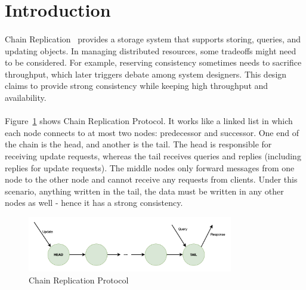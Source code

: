 \section{Introduction}
\setcounter{subsection}{0}
\renewcommand*{\thesubsection}{\Alph{subsection}.}

\paragraph*{}
Chain Replication~\cite{van2004chain} provides a storage system that supports storing, queries, and updating objects. In managing distributed resources, some tradeoffs might need to be considered. For example, reserving consistency sometimes needs to sacrifice throughput, which later triggers debate among system designers. This design claims to provide strong consistency while keeping high throughput and availability.

\paragraph*{}
Figure~\ref{fig:CRP} shows Chain Replication Protocol. It works like a linked list in which each node connects to at most two nodes: predecessor and successor. One end of the chain is the head, and another is the tail. The head is responsible for receiving update requests, whereas the tail receives queries and replies (including replies for update requests). The middle nodes only forward messages from one node to the other node and cannot receive any requests from clients. Under this scenario, anything written in the tail, the data must be written in any other nodes as well - hence it has a strong consistency.

\begin{figure}[h]
    \centering
    \includegraphics[width=0.8\textwidth]{images/ChainReplication.png}
    \caption{Chain Replication Protocol}
    \label{fig:CRP}
\end{figure}

